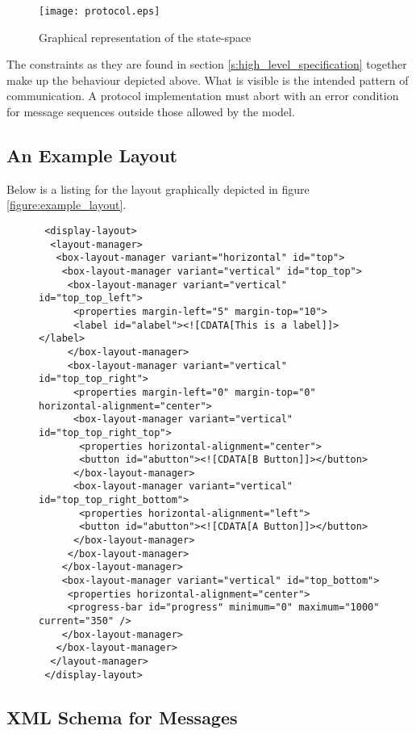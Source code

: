\documentclass{article}
\begin{document}
  \begin{figure}[H]
   \texttt{[image: protocol.eps]}
   \caption{Graphical representation of the state-space}
  \end{figure}

   The constraints as they are found in section
   \ref{s:high_level_specification} together make up the behaviour depicted
   above. What is visible is the intended pattern of communication. A protocol
   implementation must abort with an error condition for message sequences
   outside those allowed by the model.

  \pagebreak

  \subsection{An Example Layout} \label{figure:example_layout_listing}
  Below is a listing for the layout graphically depicted in figure
  \ref{figure:example_layout}.

  \begin{figure}[H]
   \small \begin{verbatim}
 <display-layout>
  <layout-manager>
   <box-layout-manager variant="horizontal" id="top">
    <box-layout-manager variant="vertical" id="top_top">
     <box-layout-manager variant="vertical" id="top_top_left">
      <properties margin-left="5" margin-top="10">
      <label id="alabel"><![CDATA[This is a label]]></label>
     </box-layout-manager>
     <box-layout-manager variant="vertical" id="top_top_right">
      <properties margin-left="0" margin-top="0" horizontal-alignment="center">
      <box-layout-manager variant="vertical" id="top_top_right_top">
       <properties horizontal-alignment="center">
       <button id="abutton"><![CDATA[B Button]]></button>
      </box-layout-manager>
      <box-layout-manager variant="vertical" id="top_top_right_bottom">
       <properties horizontal-alignment="left">
       <button id="abutton"><![CDATA[A Button]]></button>
      </box-layout-manager>
     </box-layout-manager>
    </box-layout-manager>
    <box-layout-manager variant="vertical" id="top_bottom">
     <properties horizontal-alignment="center">
     <progress-bar id="progress" minimum="0" maximum="1000" current="350" />
    </box-layout-manager>
   </box-layout-manager>
  </layout-manager>
 </display-layout>\end{verbatim}
  \normalsize
  \end{figure}

  \subsection{XML Schema for Messages}
  \label{subsection:xml_schema_messages}
\end{document}
